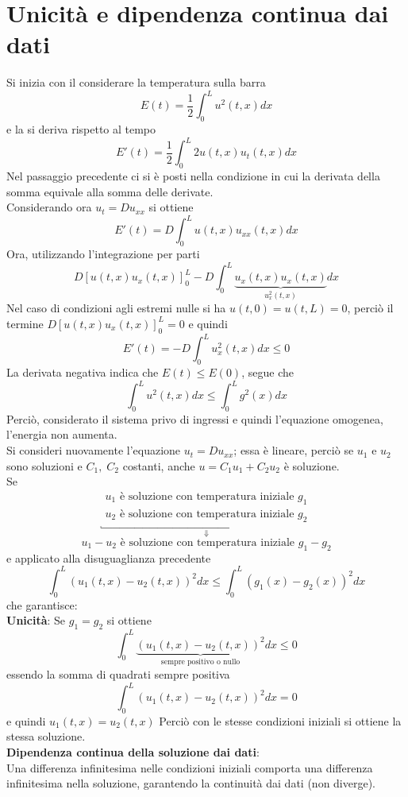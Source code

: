 \section{Unicit\`a e dipendenza continua dai dati}
Si inizia con il considerare la temperatura sulla barra
\[
	E(t)= \frac{1}{2}\int_0^L u^2 (t,x) dx
\]
e la si deriva rispetto al tempo
\[
	E'(t)= \frac{1}{2}\int_0^L 2u(t,x)u_t(t,x)dx
\]
Nel passaggio precedente ci si \`e posti nella condizione in cui la derivata della somma equivale alla somma delle derivate.\\
Considerando ora $u_t=Du_{xx}$ si ottiene
\[
	E'(t)= D\int_0^L u(t,x)u_{xx}(t,x)dx
\]
Ora, utilizzando l'integrazione per parti
\[
	D\left[u(t,x)u_x(t,x)\right]_0^L - D\int_0^L 
	\underbrace{u_x(t,x)u_x(t,x)}_{u_x^2(t,x)}dx
\]
Nel caso di condizioni agli estremi nulle si ha $u(t,0)=u(t,L)=0$, perci\`o il termine $D\left[u(t,x)u_x(t,x)\right]_0^L=0$ e quindi
\[
	E'(t)= - D \int_0^L u_x^2(t,x) dx \leq 0
\]
La derivata negativa indica che $E(t)\leq E(0)$, segue che
\[
	\int_0^L u^2(t,x)dx \leq \int_0^L g^2 (x) dx
\]
Perci\`o, considerato il sistema privo di ingressi e quindi l'equazione
omogenea, l'energia non aumenta.\\
Si consideri nuovamente l'equazione $u_t=Du_{xx}$; essa \`e lineare, perci\`o
se $u_1$ e $u_2$ sono soluzioni e $C_1,\; C_2$ costanti, anche $u=C_1u_1+C_2u_2$ \`e soluzione.\\
Se
\[
	\underbracket{
		\begin{array}{l}
			u_1 \text{ \`e soluzione con temperatura iniziale } g_1 \\
			u_2 \text{ \`e soluzione con temperatura iniziale } g_2
		\end{array}
		}_{\Downarrow}
\]
\[
	u_1-u_2 \text{ \`e soluzione con temperatura iniziale } g_1-g_2
\]
e applicato alla disuguaglianza precedente
\[
	\int_0^L \left(u_1(t,x)-u_2(t,x)\right)^2 dx
	\leq
	\int_0^L \left(g_1(x)-g_2(x)\right)^2 dx
\]
che garantisce:\\
{\bf Unicit\`a}: Se $g_1=g_2$ si ottiene
\[
	\int_0^L \underbrace{\left(u_1(t,x)-u_2(t,x)\right)^2}_\text{sempre positivo o nullo} dx
	\leq 0
\]
essendo la somma di quadrati sempre positiva
\[
	\int_0^L \left(u_1(t,x)-u_2(t,x)\right)^2 dx
	= 0
\]
e quindi $u_1(t,x)=u_2(t,x)$
Perci\`o con le stesse condizioni iniziali si ottiene la stessa soluzione.\\
{\bf Dipendenza continua della soluzione dai dati}:\\
Una differenza infinitesima nelle condizioni iniziali comporta una differenza
infinitesima nella soluzione, garantendo la continuit\`a dai dati (non diverge).

